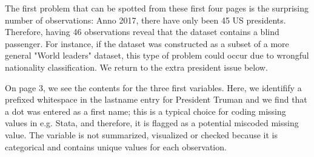 \documentclass[article,shortnames]{jss}
\begin{document}
The first problem that can be spotted from these first four pages is the surprising number of observations: Anno 2017, there have only been 45 US presidents. Therefore, having 46 observations reveal that the dataset contains a blind passenger. For instance, if the dataset was constructed as a subset of a more general "World leaders" dataset, this type of problem could occur due to wrongful nationality classification. We return to the extra president issue below. 

On page 3, we see the contents for the three first variables. Here, we identifify a prefixed whitespace in the lastname entry for President Truman and we find that a dot was entered as a first name; this is a typical choice for coding missing values in e.g. Stata, and therefore, it is flagged as a potential miscoded missing value. The variable  is not summarized, visualized or checked because it is categorical and contains unique values for each observation. 
\end{document}
